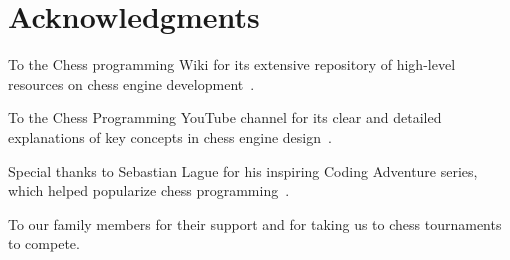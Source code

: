 
\chapter*{Acknowledgments}

\noindent To the Chess programming Wiki for its extensive repository of high-level resources on chess engine development~\cite{ChessProgrammingWiki}.

\vspace{1em}

\noindent To the Chess Programming YouTube channel for its clear and detailed explanations of key concepts in chess engine design~\cite{ChessProgrammingYT}.

\vspace{1em}

\noindent Special thanks to Sebastian Lague for his inspiring Coding Adventure series, which helped popularize chess programming~\cite{SebastianLagueYT}.

\vspace{1em}

\noindent To our family members for their support and for taking us to chess tournaments to compete.

